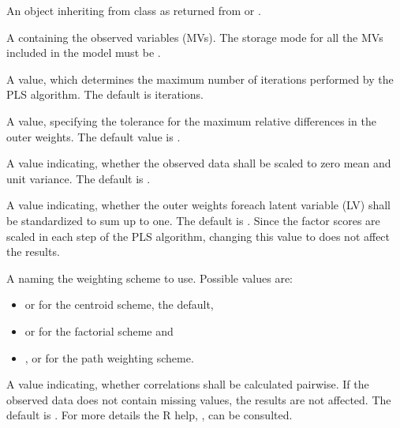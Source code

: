 \documentclass[a4paper]{book}
\begin{document}
\begin{Arguments}
\begin{ldescription}
\item[\code{model}] An object inheriting from class  as returned from 
or .

\item[\code{data}] 
A  containing the observed variables
(MVs). The storage mode for all the MVs included in the model must
be .


\item[\code{maxit}] 
A  value, which determines the maximum number of
iterations performed by the PLS algorithm. The default is 
iterations.


\item[\code{tol}] 
A  value, specifying the tolerance for the maximum relative
differences in the outer weights. The default value is
.


\item[\code{scaled}] 
A  value indicating, whether the observed
data shall be scaled to zero mean and unit variance. The default is
.


\item[\code{sum1}] 
A  value indicating, whether the outer
weights foreach latent variable (LV) shall be standardized to sum up
to one. The default is . Since the factor scores are
scaled in each step of the PLS algorithm, changing this value to
 does not affect the results.


\item[\code{wscheme}] 
A  naming the weighting scheme to
use. Possible values are:
\begin{itemize}

\item{}  or  for the centroid scheme, the default,
\item{}  or for the factorial scheme and
\item{} ,  or  for the path weighting scheme.

\end{itemize}



\item[\code{pairwise}] A  value indicating, whether
correlations shall be calculated pairwise. If the observed data
does not contain missing values, the results are not affected.
The default is . For more details the R help,
, can be consulted.


\end{ldescription}
\end{Arguments}
\end{document}
